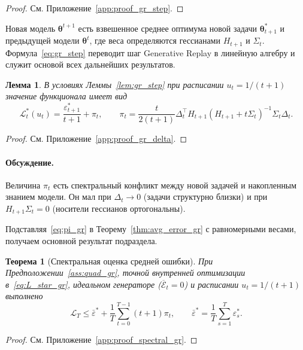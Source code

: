 \documentclass[a4paper,14pt,oneside,openany]{extarticle}
\newtheorem{theorem}{Теорема}
\newtheorem{lemma}{Лемма}
\newcommand{\cL}{\mathcal{L}}
\newcommand{\btheta}{\boldsymbol{\theta}}
\begin{document}
\begin{proof}См. Приложение~\ref{app:proof_gr_step}.\end{proof}

Новая модель $\btheta^{t+1}$ есть взвешенное среднее оптимума новой задачи $\btheta^*_{t+1}$ и предыдущей модели $\btheta^t$, где веса определяются гессианами $H_{t+1}$ и $\Sigma_t$. Формула~\eqref{eq:gr_step} переводит шаг Generative Replay в линейную алгебру и служит основой всех дальнейших результатов.

\begin{lemma}\label{lem:gr_delta}
    В условиях Леммы~\ref{lem:gr_step} при расписании $u_t = 1/(t+1)$ значение функционала имеет вид
    \begin{equation}
        \cL^*_t(u_t) = \frac{\varepsilon^*_{t+1}}{t+1} + \pi_t, \qquad \pi_t = \frac{t}{2(t+1)}\Delta_t^\top H_{t+1}(H_{t+1} + t \Sigma_t)^{-1} \Sigma_t \Delta_t.
        \label{eq:pi_gr}
    \end{equation}
\end{lemma}

\begin{proof}См. Приложение~\ref{app:proof_gr_delta}.\end{proof}

\paragraph{Обсуждение.}
Величина $\pi_t$ есть спектральный конфликт между новой задачей и накопленным знанием модели. Он мал при $\Delta_t \to 0$ (задачи структурно близки) и при $H_{t+1}\Sigma_t = 0$ (носители гессианов ортогональны).

Подставляя~\eqref{eq:pi_gr} в Теорему~\ref{thm:avg_error_gr} с равномерными весами, получаем основной результат подраздела.

\begin{theorem}[Спектральная оценка средней ошибки]\label{thm:spectral_gr}
    При Предположении~\ref{ass:quad_gr}, точной внутренней оптимизации в~\eqref{eq:L_star_gr}, идеальном генераторе ($\overline{\mathcal E}_t = 0$) и расписании $u_t = 1/(t+1)$ выполнено
    \begin{equation}
        \cL_T \le \bar\varepsilon^* + \frac{1}{T}\sum_{t=0}^{T-1}(t + 1)\pi_t, \qquad \bar\varepsilon^* = \frac{1}{T}\sum_{s=1}^T \varepsilon^*_s.
        \label{eq:spectral_master_gr}
    \end{equation}
\end{theorem}

\begin{proof}См. Приложение~\ref{app:proof_spectral_gr}.\end{proof}
\end{document}
